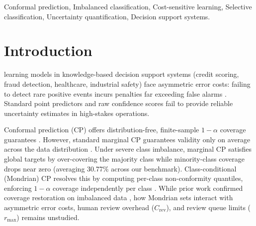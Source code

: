 \documentclass{ieeetj}
\begin{document}
\begin{IEEEkeywords}
Conformal prediction, Imbalanced classification, Cost-sensitive learning, Selective classification, Uncertainty quantification, Decision support systems.
\end{IEEEkeywords}

\maketitle

\section{Introduction}
\label{sec:intro}

 learning models in knowledge-based decision support systems (credit scoring, fraud detection, healthcare, industrial safety) face asymmetric error costs: failing to detect rare positive events incurs penalties far exceeding false alarms \cite{he2009learning, herbei2006classification, bartlett2008classification}. Standard point predictors and raw confidence scores fail to provide reliable uncertainty estimates in high-stakes operations.

Conformal prediction (CP) offers distribution-free, finite-sample $1-\alpha$ coverage guarantees \cite{vovk2005algorithmic, angelopoulos2021gentle}. However, standard marginal CP guarantees validity only on average across the data distribution \cite{lei2018distribution}. Under severe class imbalance, marginal CP satisfies global targets by over-covering the majority class while minority-class coverage drops near zero (averaging 30.77\% across our benchmark). Class-conditional (Mondrian) CP resolves this by computing per-class non-conformity quantiles, enforcing $1-\alpha$ coverage independently per class \cite{vovk2005algorithmic, sadinle2019least, lofstrom2015bias, norinder2017applying}. While prior work confirmed coverage restoration on imbalanced data \cite{toccaceli2019combination}, how Mondrian sets interact with asymmetric error costs, human review overhead ($C_{\mathrm{rev}}$), and review queue limits ($r_{\max}$) remains unstudied.
\end{document}
